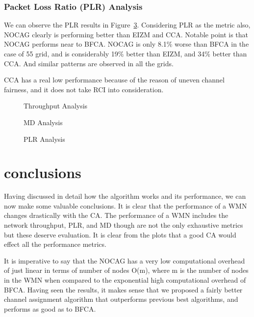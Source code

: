 \documentclass[conference]{IEEEtran}
\begin{document}
\subsubsection{Packet Loss Ratio (PLR) Analysis}

We can observe the PLR  results in Figure~\ref{plr}. 
Considering PLR as the metric also, NOCAG clearly is performing better than EIZM and CCA. 
Notable point is that NOCAG performs near to  BFCA. 
NOCAG is only 8.1\% worse than BFCA in the case of 55 grid, and  is considerably 19\% better than EIZM, and  34\% better than CCA. 
And similar patterns are observed in all the grids.

CCA has a real low performance because of the reason of uneven channel fairness, and it does not take RCI into consideration. 

\begin{figure}
    \caption{Throughput Analysis }
     \label{tput}
\end{figure} 

\begin{figure}
  \centering {\texttt{[image: md]}}
    \caption{MD Analysis }
     \label{md}
\end{figure} 

\begin{figure}
    \caption{PLR Analysis}
     \label{plr}
\end{figure} 



\section{conclusions}
Having discussed in detail how the algorithm works and its performance, we can now make some valuable conclusions. 
It is clear that the performance of a WMN changes drastically with the CA. The performance of a WMN includes the network throughput, PLR, and MD though are not the only exhaustive metrics but these deserve evaluation.
It is clear from the plots that a good CA would effect all the performance metrics.

It is imperative to say that the NOCAG has a very low computational overhead of just linear in terms of  number of nodes O(m), where m is the number of nodes in the WMN when compared to 
the exponential high computational overhead of BFCA.
Having seen the results, it makes sense that we proposed a fairly better channel assignment algorithm that
outperforms previous best algorithms, and performs as good as to BFCA.


\end{document}
